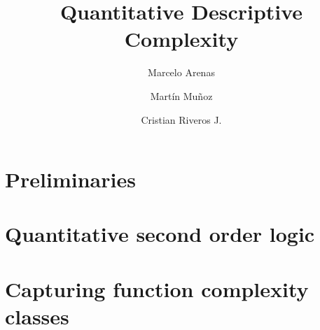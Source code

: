 \documentclass[a4paper]{article}
\begin{document}
\title{Quantitative Descriptive Complexity}
\author{Marcelo Arenas \and Mart\'in Mu\~noz \and Cristian Riveros J.}

\maketitle

\section{Preliminaries}
\label{sec:prelim}



\section{Quantitative second order logic}
\label{sec:logics}



\section{Capturing function complexity classes}
\label{sec:cap-comp}





\end{document}
